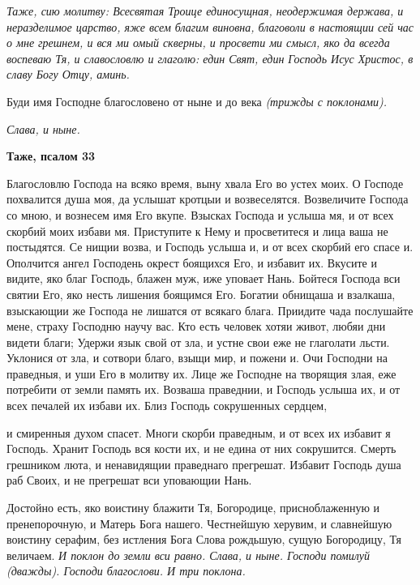  \itshape Таже, сию молитву:\normalfont{} Всесвятая Троице единосущная, неодержимая
держава, и неразделимое царство, яже всем благим виновна, благоволи в
настоящии сей час о мне грешнем, и вся ми омый скверны, и просвети ми
смысл, яко да всегда воспеваю Тя, и славословлю и глаголю: един Свят, един
Господь Исус Христос, в славу Богу Отцу, аминь.


   Буди имя Господне благословено от ныне и до века \itshape (трижды с
поклонами)\normalfont{}.


 \itshape Слава, и ныне.\normalfont{}






 

\bfseries Таже, псалом 33\normalfont{}


   Благословлю Господа на всяко время, выну хвала Его во устех моих. О
Господе похвалится душа моя, да услышат кротцыи и возвеселятся.
Возвеличите Господа со мною, и вознесем имя Его вкупе. Взысках Господа и
услыша мя, и от всех скорбий моих избави мя. Приступите к Нему и
просветитеся и лица ваша не постыдятся. Се нищии возва, и Господь услыша
и, и от всех скорбий его спасе и. Ополчится ангел Господень окрест
боящихся Его, и избавит их. Вкусите и видите, яко благ Господь,
блажен муж, иже уповает Нань. Бойтеся Господа вси святии Его,
яко несть лишения боящимся Его. Богатии обнищаша и взалкаша,
взыскающии же Господа не лишатся от всякаго блага. Приидите
чада послушайте мене, страху Господню научу вас. Кто есть человек
хотяи живот, любяи дни видети благи; Удержи язык свой от зла, и
устне свои еже не глаголати льсти. Уклонися от зла, и сотвори благо,
взыщи мир, и пожени и. Очи Господни на праведныя, и уши Его в
молитву их. Лице же Господне на творящия злая, еже потребити
от земли память их. Возваша праведнии, и Господь услыша их, и
от всех печалей их избави их. Близ Господь сокрушенных сердцем,

и смиренныя духом спасет. Многи скорби праведным, и от всех их
избавит я Господь. Хранит Господь вся кости их, и не едина от них
сокрушится. Смерть грешником люта, и ненавидящии праведнаго прегрешат.
Избавит Господь душа раб Своих, и не прегрешат вси уповающии
Нань.


   Достойно есть, яко воистину блажити Тя, Богородице, присноблаженную
и пренепорочную, и Матерь Бога нашего. Честнейшую херувим, и
славнейшую воистину серафим, без истления Бога Слова рождьшую, сущую
Богородицу, Тя величаем. \itshape И поклон до земли вси равно.\normalfont{} \itshape Слава, и ныне.\normalfont{}
Господи помилуй \itshape (дважды)\normalfont{}. Господи благослови. \itshape И три поклона.\normalfont{}


